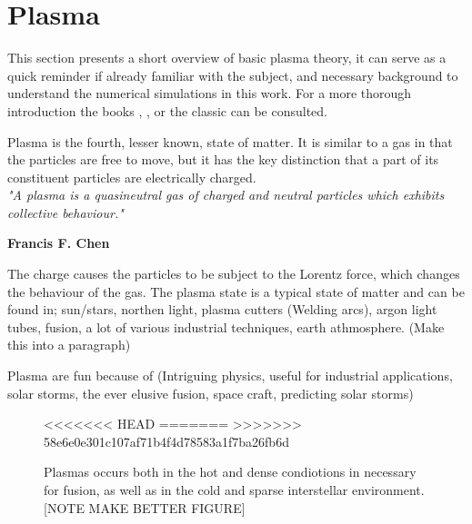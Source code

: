 \section{Plasma}
	\label{sec:plasma}
	This section presents a short overview of basic plasma theory, it can serve as a
	quick reminder if already familiar with the subject, and necessary
	background to understand the numerical simulations in this work.
	For a more thorough introduction the books \textit{}
    \citep{fitzpatrick_plasma_2014}, \textit{} \citep{goldston_introduction_1995},
    \textit{} \citep{pecseli_waves_2012} or the classic
    \textit{} \citep{chen_introduction_1984} can be consulted.

	Plasma is the fourth, lesser known, state of matter. It is similar to a gas
	in that the particles are free to move, but it has the key distinction that
	a part of its constituent particles are electrically charged.
	\\[1.0cm]
	\indent \textit{\large"A plasma is a quasineutral gas of charged and neutral particles which exhibits
	collective behaviour."}
	\begin{flushright}
	    \textbf{Francis F. Chen}\\[1.0cm]
	\end{flushright}
	The charge causes the particles to be subject to the Lorentz force, which
	changes the behaviour of the gas. The plasma state is a typical state of matter
	and can be found in;
	sun/stars, northen light, plasma cutters (Welding arcs), argon light tubes, fusion, a lot of various
	industrial techniques, earth athmosphere. (Make this into a paragraph)

	Plasma are fun because of (Intriguing physics, useful for industrial applications,
	solar storms, the ever elusive fusion, space craft, predicting solar storms)

	\begin{figure}
		\begin{center}
<<<<<<< HEAD
=======
>>>>>>> 58e6e0e301c107af71b4f4d78583a1f7ba26fb6d
		\end{center}
		\caption{Plasmas occurs both in the hot and dense condiotions in necessary for fusion, as
		well as in the cold and sparse interstellar environment. [NOTE MAKE BETTER FIGURE]
		}
	\end{figure}



